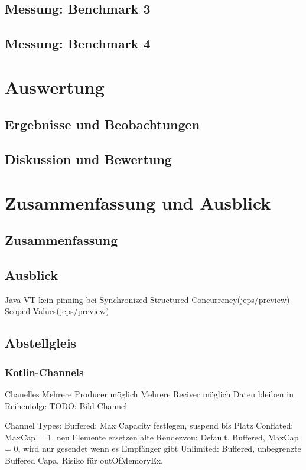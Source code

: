 \documentclass[fontsize=12pt,paper=a4,twoside=semi,parskip=half-,headsepline,headinclude]{scrreprt}
\begin{document}
\section{Messung: Benchmark 3}

\section{Messung: Benchmark 4}



\chapter{Auswertung}

\section{Ergebnisse und Beobachtungen}

\section{Diskussion und Bewertung}



\chapter{Zusammenfassung und Ausblick}

\section{Zusammenfassung}

\section{Ausblick}
Java VT kein pinning bei Synchronized
Structured Concurrency(jeps/preview)
Scoped Values(jeps/preview)

\section{Abstellgleis}
\subsection{Kotlin-Channels}

Chanelles
Mehrere Producer möglich
Mehrere Reciver möglich
Daten bleiben in Reihenfolge
TODO: Bild Channel

Channel Types:
Buffered: Max Capacity festlegen, suspend bis Platz
Conflated: MaxCap = 1, neu Elemente ersetzen alte
Rendezvou: Default, Buffered, MaxCap = 0, wird nur gesendet wenn es Empfänger gibt
Unlimited: Buffered, unbegrenzte Buffered Capa, Risiko für outOfMemoryEx.
\end{document}
